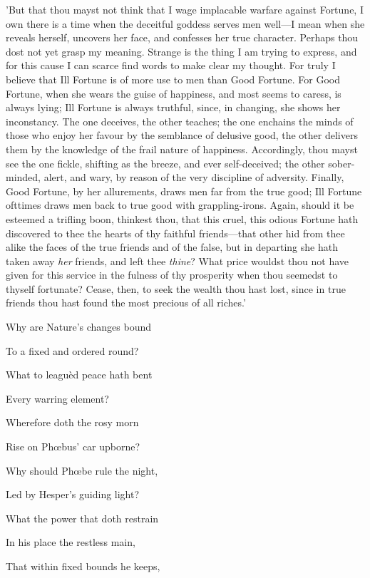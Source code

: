 'But that thou mayst not think that I wage implacable warfare against
Fortune, I own there is a time when the deceitful goddess serves men
well—I mean when she reveals herself, uncovers her face, and confesses
her true character. Perhaps thou dost not yet grasp my meaning. Strange
is the thing I am trying to express, and for this cause I can scarce
find words to make clear my thought. For truly I believe that Ill
Fortune is of more use to men than Good Fortune. For Good Fortune, when
she wears the guise of happiness, and most seems to caress, is always
lying; Ill Fortune is always truthful, since, in changing, she shows her
inconstancy. The one deceives, the other teaches; the one enchains the
minds of those who enjoy her favour by the semblance of delusive good,
the other delivers them by the knowledge of the frail nature of
happiness. Accordingly, thou mayst see the one fickle, shifting as the
breeze, and ever self-deceived; the other sober-minded, alert, and wary,
by reason of the very discipline of adversity. Finally, Good Fortune, by
her allurements, draws men far from the true good; Ill Fortune ofttimes
draws men back to true good with grappling-irons. Again, should it be
esteemed a trifling boon, thinkest thou, that this cruel, this odious
Fortune hath discovered to thee the hearts of thy faithful friends—that
other hid from thee alike the faces of the true friends and of the
false, but in departing she hath taken away \emph{her} friends, and left thee
\emph{thine}? What price wouldst thou not have given for this service in the
fulness of thy prosperity when thou seemedst to thyself fortunate?
Cease, then, to seek the wealth thou hast lost, since in true friends
thou hast found the most precious of all riches.'


Why are Nature's changes bound

To a fixed and ordered round?

What to leaguèd peace hath bent

Every warring element?

Wherefore doth the rosy morn

Rise on Phœbus' car upborne?

Why should Phœbe rule the night,

Led by Hesper's guiding light?

What the power that doth restrain

In his place the restless main,

That within fixed bounds he keeps,

